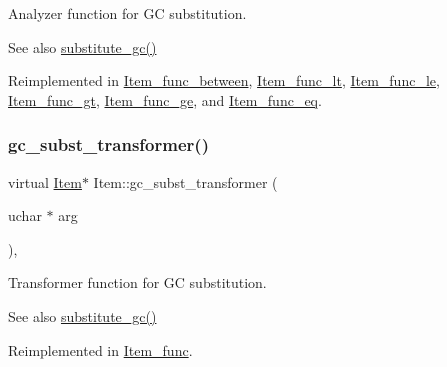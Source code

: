 Analyzer function for GC substitution. \begin{DoxySeeAlso}{See also}
\mbox{\hyperlink{group__Query__Optimizer_gaa95a062cdd785687a638e01d7ad85d11}{substitute\+\_\+gc()}} 
\end{DoxySeeAlso}


Reimplemented in \mbox{\hyperlink{classItem__func__between_a3f2bb762cdae1a93c78425d5752b274f}{Item\+\_\+func\+\_\+between}}, \mbox{\hyperlink{classItem__func__lt_aa224df880d91b7ece8f36854f3d2db5d}{Item\+\_\+func\+\_\+lt}}, \mbox{\hyperlink{classItem__func__le_a1ee55d9e7ec7f51098181a95c377104e}{Item\+\_\+func\+\_\+le}}, \mbox{\hyperlink{classItem__func__gt_a1b58f75ad3398ed88cf619f1d54109a8}{Item\+\_\+func\+\_\+gt}}, \mbox{\hyperlink{classItem__func__ge_af4066c4cdee18479038378285cdb48cb}{Item\+\_\+func\+\_\+ge}}, and \mbox{\hyperlink{classItem__func__eq_a085a3e6f03cf5e3915949e4f6bc9f53c}{Item\+\_\+func\+\_\+eq}}.

\mbox{\label{classItem_a09908dd05d73b9ca1eda2ed8b00d87f4}} 
\subsubsection{\texorpdfstring{gc\+\_\+subst\+\_\+transformer()}{gc\_subst\_transformer()}}
{\footnotesize\ttfamily virtual \mbox{\hyperlink{classItem}{Item}}$\ast$ Item\+::gc\+\_\+subst\+\_\+transformer (\begin{DoxyParamCaption}\item[{uchar $\ast$}]{arg }\end{DoxyParamCaption})\hspace{0.3cm}{\ttfamily [inline]}, {\ttfamily [virtual]}}

Transformer function for GC substitution. \begin{DoxySeeAlso}{See also}
\mbox{\hyperlink{group__Query__Optimizer_gaa95a062cdd785687a638e01d7ad85d11}{substitute\+\_\+gc()}} 
\end{DoxySeeAlso}


Reimplemented in \mbox{\hyperlink{classItem__func_acac46454222156dbb8336cc709c6cf41}{Item\+\_\+func}}.

\mbox{\label{classItem_a394b578242abd51ee9ca269cd21e4147}} 
